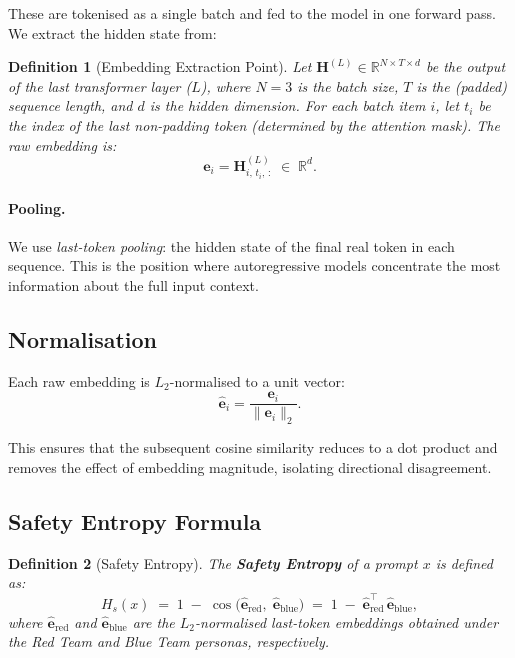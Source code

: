 \documentclass[12pt,a4paper]{article}
\newtheorem{definition}{Definition}
\begin{document}
These are tokenised as a single batch and fed to the model in one
forward pass.  We extract the hidden state from:

\begin{definition}[Embedding Extraction Point]
\label{def:embedding}
Let $\mathbf{H}^{(L)} \in \mathbb{R}^{N \times T \times d}$ be the
output of the \emph{last} transformer layer ($L$), where $N=3$ is the
batch size, $T$ is the (padded) sequence length, and $d$ is the hidden
dimension.  For each batch item $i$, let $t_i$ be the index of the last
non-padding token (determined by the attention mask).  The raw embedding
is:
\begin{equation}
  \mathbf{e}_i = \mathbf{H}^{(L)}_{i,\, t_i,\, :}
  \;\in\; \mathbb{R}^{d}.
\end{equation}
\end{definition}

\paragraph{Pooling.} We use \emph{last-token pooling}: the hidden state
of the final real token in each sequence.  This is the position where
autoregressive models concentrate the most information about the full
input context.

\subsection{Normalisation}
\label{sec:entropy:normalisation}

Each raw embedding is $L_2$-normalised to a unit vector:
\begin{equation}
  \hat{\mathbf{e}}_i = \frac{\mathbf{e}_i}{\|\mathbf{e}_i\|_2}.
\end{equation}

This ensures that the subsequent cosine similarity reduces to a dot
product and removes the effect of embedding magnitude, isolating
directional disagreement.

\subsection{Safety Entropy Formula}
\label{sec:entropy:formula}

\begin{definition}[Safety Entropy]
\label{def:safety_entropy}
The \textbf{Safety Entropy} of a prompt $x$ is defined as:
\begin{equation}
  H_s(x)
  \;=\; 1 \;-\; \cos\!\bigl(\hat{\mathbf{e}}_{\text{red}},\;
        \hat{\mathbf{e}}_{\text{blue}}\bigr)
  \;=\; 1 \;-\; \hat{\mathbf{e}}_{\text{red}}^{\top}\,
        \hat{\mathbf{e}}_{\text{blue}},
\end{equation}
where $\hat{\mathbf{e}}_{\text{red}}$ and
$\hat{\mathbf{e}}_{\text{blue}}$ are the $L_2$-normalised last-token
embeddings obtained under the Red Team and Blue Team personas,
respectively.
\end{definition}
\end{document}
